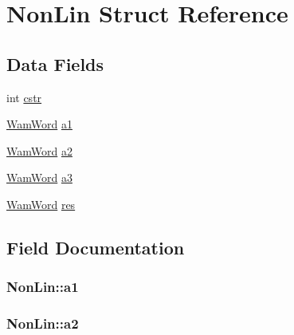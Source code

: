 \hypertarget{structNonLin}{}\section{Non\+Lin Struct Reference}
\label{structNonLin}
\subsection*{Data Fields}
\begin{DoxyCompactItemize}
\item 
int \hyperlink{structNonLin_ace702860218e3fed62bb3235547358aa}{cstr}
\item 
\hyperlink{LINUX__SIGSEGV_8c_a10ea8be8823feb38875b8a9326cbb424}{Wam\+Word} \hyperlink{structNonLin_a143b9a64bce8684b7cc00bea2c48639b}{a1}
\item 
\hyperlink{LINUX__SIGSEGV_8c_a10ea8be8823feb38875b8a9326cbb424}{Wam\+Word} \hyperlink{structNonLin_a94219bccdea182e374720870a013da88}{a2}
\item 
\hyperlink{LINUX__SIGSEGV_8c_a10ea8be8823feb38875b8a9326cbb424}{Wam\+Word} \hyperlink{structNonLin_a3e4eeac9f54cd48366e50824833a9271}{a3}
\item 
\hyperlink{LINUX__SIGSEGV_8c_a10ea8be8823feb38875b8a9326cbb424}{Wam\+Word} \hyperlink{structNonLin_af8f4e398e6c9371309ae73d04456f4f0}{res}
\end{DoxyCompactItemize}


\subsection{Field Documentation}
\subsubsection[{\texorpdfstring{a1}{a1}}]{ Non\+Lin\+::a1}\hypertarget{structNonLin_a143b9a64bce8684b7cc00bea2c48639b}{}\label{structNonLin_a143b9a64bce8684b7cc00bea2c48639b}
\subsubsection[{\texorpdfstring{a2}{a2}}]{ Non\+Lin\+::a2}\hypertarget{structNonLin_a94219bccdea182e374720870a013da88}{}\label{structNonLin_a94219bccdea182e374720870a013da88}

